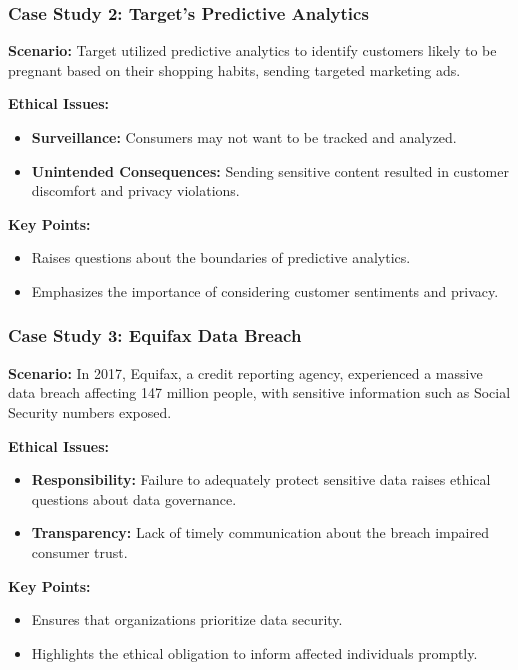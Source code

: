 \documentclass[aspectratio=169]{beamer}
\begin{document}
\begin{frame}[fragile]
    \frametitle{Case Study 2: Target's Predictive Analytics}
    \textbf{Scenario:} Target utilized predictive analytics to identify customers likely to be pregnant based on their shopping habits, sending targeted marketing ads.

    \textbf{Ethical Issues:}
    \begin{itemize}
        \item \textbf{Surveillance:} Consumers may not want to be tracked and analyzed.
        \item \textbf{Unintended Consequences:} Sending sensitive content resulted in customer discomfort and privacy violations.
    \end{itemize}

    \textbf{Key Points:}
    \begin{itemize}
        \item Raises questions about the boundaries of predictive analytics.
        \item Emphasizes the importance of considering customer sentiments and privacy.
    \end{itemize}
\end{frame}

\begin{frame}[fragile]
    \frametitle{Case Study 3: Equifax Data Breach}
    \textbf{Scenario:} In 2017, Equifax, a credit reporting agency, experienced a massive data breach affecting 147 million people, with sensitive information such as Social Security numbers exposed.

    \textbf{Ethical Issues:}
    \begin{itemize}
        \item \textbf{Responsibility:} Failure to adequately protect sensitive data raises ethical questions about data governance.
        \item \textbf{Transparency:} Lack of timely communication about the breach impaired consumer trust.
    \end{itemize}

    \textbf{Key Points:}
    \begin{itemize}
        \item Ensures that organizations prioritize data security.
        \item Highlights the ethical obligation to inform affected individuals promptly.
    \end{itemize}
\end{frame}
\end{document}
